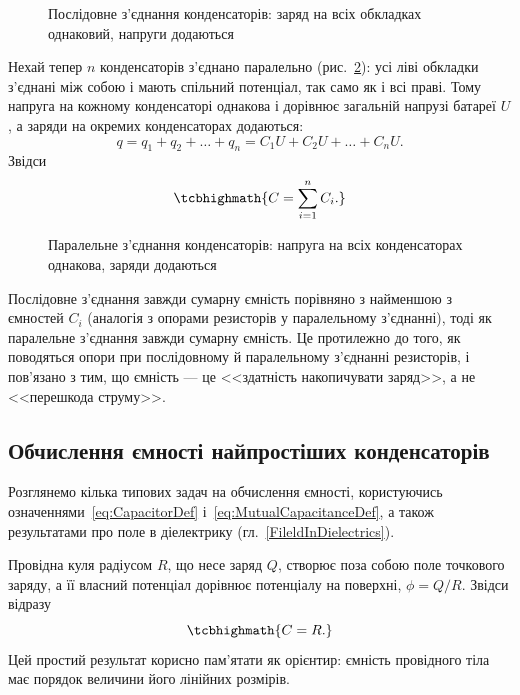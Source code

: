 \begin{figure}[h!]\centering
	\caption{Послідовне з'єднання конденсаторів: заряд на всіх обкладках однаковий, напруги
		додаються\label{pic:CapacitorsSeries}}
\end{figure}

 Нехай тепер $n$ конденсаторів з'єднано паралельно (рис.~\ref{pic:CapacitorsParallel}): усі ліві обкладки з'єднані між
собою і мають спільний потенціал, так само як і всі праві. Тому напруга на кожному конденсаторі однакова і дорівнює загальній напрузі батареї $U$, а
заряди на окремих конденсаторах додаються:
\begin{equation*}
	q = q_1 + q_2 + \ldots + q_n = C_1 U + C_2 U + \ldots + C_n U.
\end{equation*}
Звідси
\begin{equation}\label{eq:ParallelCap}
	\tcbhighmath{
		C = \sum\limits_{i=1}^n C_i.
	}
\end{equation}

\begin{figure}[h!]\centering
	\caption{Паралельне з'єднання конденсаторів: напруга на всіх конденсаторах однакова, заряди
		додаються\label{pic:CapacitorsParallel}}
\end{figure}

\begin{Attention}
	Послідовне з'єднання завжди  сумарну ємність порівняно з найменшою з ємностей $C_i$ (аналогія з опорами резисторів у
	паралельному з'єднанні), тоді як паралельне з'єднання завжди  сумарну ємність. Це протилежно до того, як поводяться опори при
	послідовному й паралельному з'єднанні резисторів, і пов'язано з тим, що ємність --- це <<здатність накопичувати заряд>>, а не <<перешкода струму>>.
\end{Attention}

\subsection*{Обчислення ємності найпростіших конденсаторів}

Розглянемо кілька типових задач на обчислення ємності, користуючись означеннями~\eqref{eq:CapacitorDef} і~\eqref{eq:MutualCapacitanceDef}, а також
результатами про поле в діелектрику (гл.~\ref{FileldInDielectrics}).

 Провідна куля радіусом $R$, що несе заряд $Q$, створює поза собою поле точкового заряду, а її власний потенціал
дорівнює потенціалу на поверхні, $\phi = Q/R$. Звідси відразу
\begin{equation}\label{eq:SphereCap}
	\tcbhighmath{
		C = R.
	}
\end{equation}
Цей простий результат корисно пам'ятати як орієнтир: ємність провідного тіла має порядок величини його лінійних розмірів.

